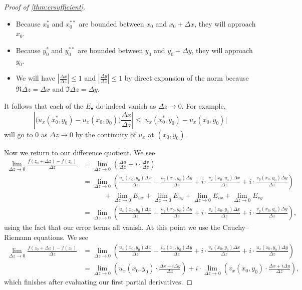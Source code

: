 \documentclass[../notes.tex]{subfiles}
\begin{document}
\begin{proof}[Proof of \autoref{thm:crsufficient}]
\begin{itemize}
		\item Because $x_0^*$ and $x_0^{**}$ are bounded between $x_0$ and $x_0+\Delta x$, they will approach $x_0$.
		\item Because $y_0^*$ and $y_0^{**}$ are bounded between $y_0$ and $y_0+\Delta y$, they will approach $y_0$.
		\item We will have $\left|\frac{\Delta x}{\Delta z}\right|\le1$ and $\left|\frac{\Delta y}{\Delta z}\right|\le1$ by direct expansion of the norm because $\Re\Delta z=\Delta x$ and $\Im\Delta z=\Delta y$.
	\end{itemize}
	It follows that each of the $E_\bullet$ do indeed vanish as $\Delta z\to0$. For example,
	\[\left|\big(u_x(x_0^*,y_0)-u_x(x_0,y_0)\big)\frac{\Delta x}{\Delta z}\right|\le\big|u_x(x_0^*,y_0)-u_x(x_0,y_0)\big|\]
	will go to $0$ as $\Delta z\to0$ by the continuity of $u_x$ at $(x_0,y_0)$.

	Now we return to our difference quotient. We see
	\begin{align*}
		\lim_{\Delta z\to0}\frac{f(z_0+\Delta z)-f(z_0)}{\Delta z} &= \lim_{\Delta z\to0}\left(\frac{\Delta u}{\Delta z}+i\cdot\frac{\Delta v}{\Delta z}\right) \\
		&= \lim_{\Delta z\to0}\left(\frac{u_x(x_0,y_0)\Delta x}{\Delta z}+\frac{u_y(x_0,y_0)\Delta y}{\Delta z}+i\cdot\frac{v_x(x_0,y_0)\Delta x}{\Delta z}+i\cdot\frac{v_y(x_0,y_0)\Delta y}{\Delta z}\right) \\
		&\qquad\quad+\lim_{\Delta z\to0}E_{ux}+\lim_{\Delta z\to0}E_{uy}+\lim_{\Delta z\to0}E_{vx}+\lim_{\Delta z\to0}E_{vy} \\
		&= \lim_{\Delta z\to0}\left(\frac{u_x(x_0,y_0)\Delta x}{\Delta z}+\frac{u_y(x_0,y_0)\Delta y}{\Delta z}+i\cdot\frac{v_x(x_0,y_0)\Delta x}{\Delta z}+i\cdot\frac{v_y(x_0,y_0)\Delta y}{\Delta z}\right),
	\end{align*}
	using the fact that our error terms all vanish. At this point we use the Cauchy--Riemann equations. We see
	\begin{align*}
		\lim_{\Delta z\to0}\frac{f(z_0+\Delta z)-f(z_0)}{\Delta z} &= \lim_{\Delta z\to0}\left(\frac{u_x(x_0,y_0)\Delta x}{\Delta z}-\frac{v_x(x_0,y_0)\Delta y}{\Delta z}+i\cdot\frac{v_x(x_0,y_0)\Delta x}{\Delta z}+i\cdot\frac{u_x(x_0,y_0)\Delta y}{\Delta z}\right) \\
		&= \lim_{\Delta z\to0}\left(u_x(x_0,y_0)\cdot\frac{\Delta x+i\Delta y}{\Delta z}\right)+i\cdot\lim_{\Delta z\to0}\left(v_x(x_0,y_0)\cdot\frac{\Delta x+i\Delta y}{\Delta z}\right),
	\end{align*}
	which finishes after evaluating our first partial derivatives.
\end{proof}
\end{document}
